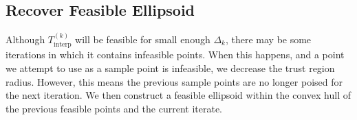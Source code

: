 \documentclass{article}
\newenvironment{comment}
  {\par\medskip
   \color{red}%
   \begin{framed}
   \textbf{Comment: }\ignorespaces}
 {\end{framed}
  \medskip}
\theoremstyle{case}
\numberwithin{theorem}{subsection}
\newcommand{\dk}{\Delta_k}
\newcommand{\mcik}{{{m}^{(k)}_{c_i}}}
\newcommand{\mfk}{{{m}_f}^{(k)}}
\newcommand{\reals}{\mathbb R}
\newcommand{\Rn}{\mathbb R^n}
\newcommand{\sampletrk}{{T_{\text{interp}}^{(k)}}}
\newcommand{\trsinfset}{{E_\textrm{infeasible}}}
\newcommand{\trstol}{{\delta_\textrm{infeasible}}}
\newcommand{\xk}{x^{(k)}}
\begin{document}
% 
% 
% 
% 
% 
% 



\subsection{Recover Feasible Ellipsoid}

Although $\sampletrk$ will be feasible for small enough $\dk$, there may be some iterations in which it contains infeasible points.
When this happens, and a point we attempt to use as a sample point is infeasible, we decrease the trust region radius.
However, this means the previous sample points are no longer poised for the next iteration.
We then construct a feasible ellipsoid within the convex hull of the previous feasible points and the current iterate.

%             
% 
\end{document}
